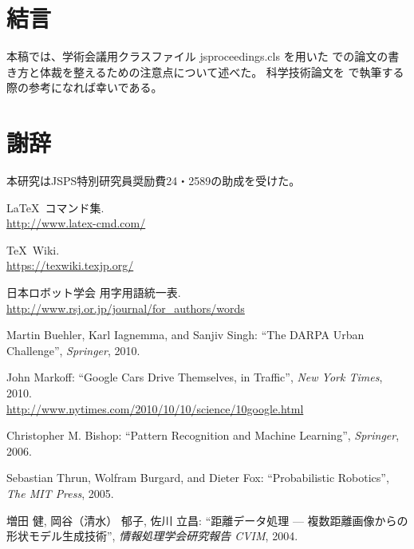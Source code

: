 \documentclass[uplatex, twocolumn, 9pt]{jsproceedings}
\begin{document}
\section{結言}
本稿では、学術会議用クラスファイル jsproceedings.cls を用いた \LaTeXe での論文の書き方と体裁を整えるための注意点について述べた。
科学技術論文を \LaTeXe で執筆する際の参考になれば幸いである。

\section*{謝辞}
本研究はJSPS特別研究員奨励費24・2589の助成を受けた。

\footnotesize
\begin{thebibliography}{99}
\LaTeX~コマンド集.\\
\url{http://www.latex-cmd.com/}

\TeX~Wiki.\\
\url{https://texwiki.texjp.org/}

日本ロボット学会 用字用語統一表.\\
\url{http://www.rsj.or.jp/journal/for_authors/words}


Martin Buehler, Karl Iagnemma, and Sanjiv Singh: ``The DARPA Urban Challenge'', \textit{Springer}, 2010.

John Markoff: ``Google Cars Drive Themselves, in Traffic'', \textit{New York Times}, 2010.\\
\url{http://www.nytimes.com/2010/10/10/science/10google.html}

Christopher M. Bishop: ``Pattern Recognition and Machine Learning'', \textit{Springer}, 2006.


Sebastian Thrun, Wolfram Burgard, and Dieter Fox: ``Probabilistic Robotics'', \textit{The MIT Press}, 2005.


増田 健, 岡谷（清水） 郁子, 佐川 立昌: ``距離データ処理 --- 複数距離画像からの形状モデル生成技術'', \textit{情報処理学会研究報告 CVIM}, 2004.


\end{thebibliography}
\end{document}
